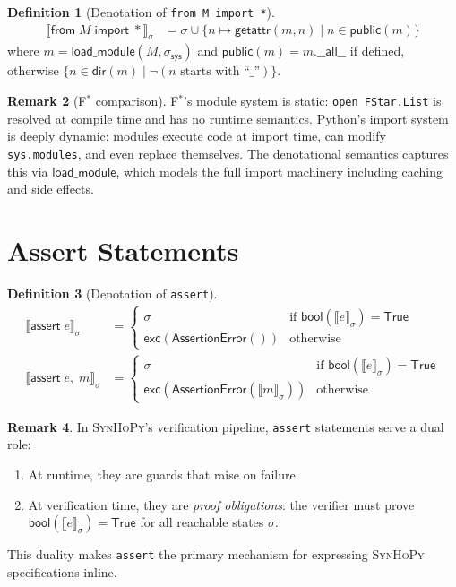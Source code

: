 \documentclass[11pt,a4paper]{report}
\theoremstyle{definition}
\newtheorem{definition}{Definition}[chapter]
\newtheorem{remark}[definition]{Remark}
\theoremstyle{plain}
\newcommand{\den}[1]{\llbracket #1 \rrbracket}
\newcommand{\fstar}{F$^{*}$}
\newcommand{\synhopy}{\textsc{SynHoPy}}
\begin{document}
\begin{definition}[Denotation of \texttt{from M import *}]
\begin{align}
  \den{\mathsf{from}\;M\;\mathsf{import}\;*}_\sigma
    &= \sigma \cup \{n \mapsto \mathsf{getattr}(m, n) \mid n \in \mathsf{public}(m)\}
\end{align}
where $m = \mathsf{load\_module}(M, \sigma_{\mathsf{sys}})$ and
$\mathsf{public}(m) = m.\mathsf{\_\_all\_\_}$ if defined, otherwise
$\{n \in \mathsf{dir}(m) \mid \neg(\text{$n$ starts with ``\_''})\}$.
\end{definition}

\begin{remark}[\fstar{} comparison]
\fstar{}'s module system is static: \lstinline[style=fstar]|open FStar.List|
is resolved at compile time and has no runtime semantics.  Python's import
system is deeply dynamic: modules execute code at import time, can modify
\lstinline[style=python]{sys.modules}, and even replace themselves.  The
denotational semantics captures this via $\mathsf{load\_module}$, which
models the full import machinery including caching and side effects.
\end{remark}


\section{Assert Statements}

\begin{definition}[Denotation of \texttt{assert}]
\begin{align}
  \den{\mathsf{assert}\;e}_\sigma
    &= \begin{cases}
      \sigma & \text{if } \mathsf{bool}(\den{e}_\sigma) = \mathsf{True} \\
      \mathsf{exc}(\mathsf{AssertionError}()) & \text{otherwise}
    \end{cases} \\
  \den{\mathsf{assert}\;e,\; m}_\sigma
    &= \begin{cases}
      \sigma & \text{if } \mathsf{bool}(\den{e}_\sigma) = \mathsf{True} \\
      \mathsf{exc}(\mathsf{AssertionError}(\den{m}_\sigma)) & \text{otherwise}
    \end{cases}
\end{align}
\end{definition}

\begin{remark}
In \synhopy{}'s verification pipeline, \lstinline[style=python]{assert}
statements serve a dual role:
\begin{enumerate}
  \item At runtime, they are guards that raise on failure.
  \item At verification time, they are \emph{proof obligations}: the verifier
    must prove $\mathsf{bool}(\den{e}_\sigma) = \mathsf{True}$ for all
    reachable states $\sigma$.
\end{enumerate}
This duality makes \lstinline[style=python]{assert} the primary mechanism
for expressing \synhopy{} specifications inline.
\end{remark}
\end{document}
